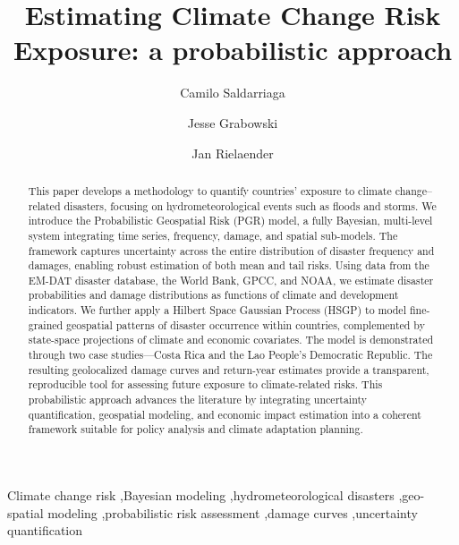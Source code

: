 \documentclass[preprint,12pt,authoryear]{elsarticle}
\begin{document}
\begin{frontmatter}

\title{Estimating Climate Change Risk Exposure: a probabilistic approach}

\author[label1]{Camilo Saldarriaga}

\author[label2]{Jesse Grabowski}

\author[label3]{Jan Rielaender}

\begin{abstract}
This paper develops a methodology to quantify countries' exposure to climate change--related disasters, focusing on hydrometeorological events such as floods and storms. We introduce the Probabilistic Geospatial Risk (PGR) model, a fully Bayesian, multi-level system integrating time series, frequency, damage, and spatial sub-models. The framework captures uncertainty across the entire distribution of disaster frequency and damages, enabling robust estimation of both mean and tail risks. Using data from the EM-DAT disaster database, the World Bank, GPCC, and NOAA, we estimate disaster probabilities and damage distributions as functions of climate and development indicators. We further apply a Hilbert Space Gaussian Process (HSGP) to model fine-grained geospatial patterns of disaster occurrence within countries, complemented by state-space projections of climate and economic covariates. The model is demonstrated through two case studies---Costa Rica and the Lao People's Democratic Republic. The resulting geolocalized damage curves and return-year estimates provide a transparent, reproducible tool for assessing future exposure to climate-related risks. This probabilistic approach advances the literature by integrating uncertainty quantification, geospatial modeling, and economic impact estimation into a coherent framework suitable for policy analysis and climate adaptation planning.
\end{abstract}

\begin{keyword}
Climate change risk \sep Bayesian modeling \sep hydrometeorological disasters \sep geo-spatial modeling \sep probabilistic risk assessment \sep damage curves \sep uncertainty quantification
\end{keyword}

\end{frontmatter}
\end{document}
